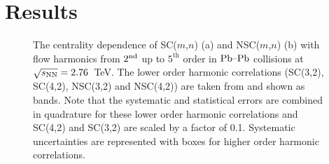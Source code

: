 \section{Results}
\label{sec:results}
\begin{figure}[h]
            \begin{center}
        \caption{The centrality dependence of SC($m$,$n$) (a) and NSC($m$,$n$) (b) with flow harmonics from $2^{\rm nd}$ up to $5^{\mathrm{th}}$ order in $\textnormal{Pb--Pb}$ collisions at $\sqrt{s_{\textnormal{NN}}}=2.76$~TeV. The lower order harmonic correlations (SC(3,2), SC(4,2), NSC(3,2) and NSC(4,2)) are taken from \cite{ALICE:2016kpq} and shown as bands. Note that the systematic and statistical errors are combined in quadrature for these lower order harmonic correlations and SC(4,2) and SC(3,2) are scaled by a factor of 0.1. Systematic uncertainties are represented with boxes for higher order harmonic correlations.}
        \label{fig:Figure_1}
              \end{center}
\end{figure}

